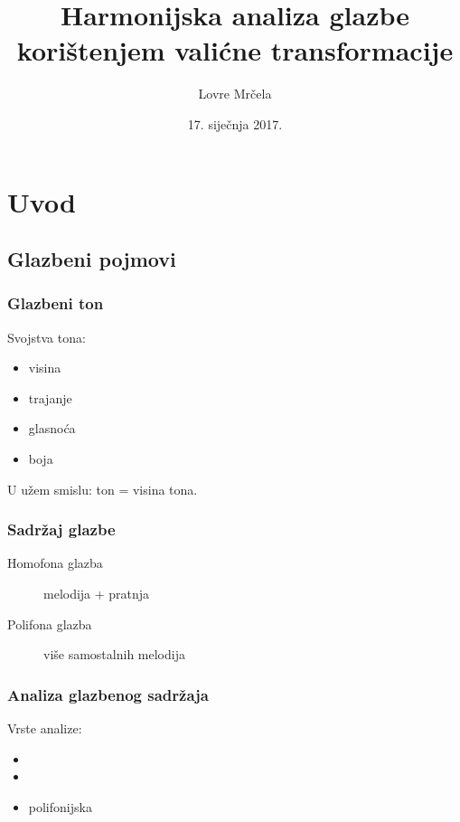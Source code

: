 \documentclass[11pt]{beamer}
\begin{document}
  \author{Lovre Mrčela}
  \title[Harmonijska analiza glazbe]{Harmonijska analiza glazbe\\korištenjem valićne transformacije}
  \date{17. siječnja 2017.}
  \frame[plain]{\maketitle}
  

  \section{Uvod}
  
  \subsection{Glazbeni pojmovi}
  \begin{frame}
    \frametitle{Glazbeni ton}
    Svojstva tona:
    \begin{itemize}
      \item visina
      \item trajanje
      \item glasnoća
      \item boja
    \end{itemize}
    \vspace{10pt}
    U užem smislu: ton = visina tona.
  \end{frame}

  \begin{frame}
    \frametitle{Sadržaj glazbe}
    \begin{description}
      \item[Homofona glazba] melodija + pratnja
      \item[Polifona glazba] više samostalnih melodija
    \end{description}
  \end{frame}

  \begin{frame}
    \frametitle{Analiza glazbenog sadržaja}
    Vrste analize:
    \begin{itemize}
      \item {}
      \item {}
      \item polifonijska
      \pause
    \end{itemize}
  \end{frame}
\end{document}
